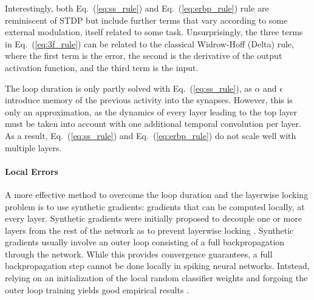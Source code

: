 \documentclass[english]{article}
\renewcommand{\refeq}[1]{{Eq.~(\ref{#1})}}
\renewcommand{\cite}{\citep}
\begin{document}
Interestingly, both \refeq{eq:ss_rule} and \refeq{eq:erbp_rule} rule are reminiscent of \ac{STDP} but include further terms that vary according to some external modulation, itself related to some task. 
Unsurprisingly, the three terms in \refeq{eq:3f_rule} can be related to the classical Widrow-Hoff (Delta) rule, where the first term is the error, the second is the derivative of the output activation function, and the third term is the input.

The loop duration is only partly solved with \refeq{eq:ss_rule}, as $\alpha$ and $\epsilon$ introduce memory of the previous activity into the synapses. However, this is only an approximation, as the dynamics of every layer leading to the top layer must be taken into account with one additional temporal convolution per layer. As a result, \refeq{eq:ss_rule} and \refeq{eq:erbp_rule} do not scale well with multiple layers. 

\paragraph{Local Errors}
A more effective method to overcome the loop duration and the layerwise locking problem is to use synthetic gradients: gradients that can be computed locally, at every layer. 
Synthetic gradients were initially proposed to decouple one or more layers from the rest of the network as to prevent layerwise locking \cite{Jaderberg_etal16_deconeur}.
Synthetic gradients usually involve an outer loop consisting of a full backpropagation through the network. 
While this provides convergence guarantees, a full backpropagation step cannot be done locally in spiking neural networks. 
Intstead, relying on an initialization of the local random classifier weights and forgoing the outer loop training yields good empirical results \cite{Mostafa_etal17_deepsupe}.
\end{document}
